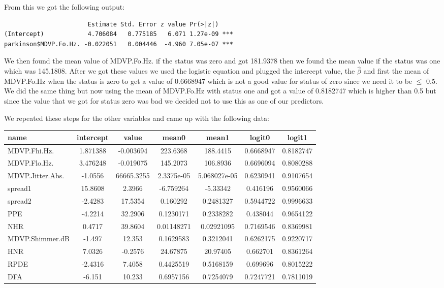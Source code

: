\documentclass{article}
\begin{document}
From this we got the following output:

\begin{verbatim}
                       Estimate Std. Error z value Pr(>|z|)    
(Intercept)            4.706084   0.775185   6.071 1.27e-09 ***
parkinson$MDVP.Fo.Hz. -0.022051   0.004446  -4.960 7.05e-07 ***
\end{verbatim}

We then found the mean value of MDVP.Fo.Hz. if the status was zero and got 181.9378 then we found the mean value if the status was one which was 145.1808. After we got these values we used the logistic equation and plugged the intercept value, the $\hat{\beta}$ and first the mean of MDVP.Fo.Hz when the status is zero to get a value of 0.6668947 which is not a good value for status of zero since we need it to be $\leq$ 0.5. We did the same thing but now using the mean of MDVP.Fo.Hz with status one and got a value of 0.8182747 which is higher than 0.5 but since the value that we got for status zero was bad we decided not to use this as one of our predictors.

We repeated these steps for the other variables and came up with the following data:

\begin{table}[h]
  \centering
\begin{tabular}{|l|c|c|c|c|c|c|}
\hline
name & intercept & value & mean0 & mean1 & logit0 & logit1 \\
\hline
MDVP.Fhi.Hz. & 1.871388 & -0.003694 & 223.6368 & 188.4415 & 0.6668947 & 0.8182747 \\
\hline
MDVP.Flo.Hz. & 3.476248 & -0.019075 & 145.2073 & 106.8936 & 0.6696094 & 0.8080288 \\
\hline
MDVP.Jitter.Abs. & -1.0556 & 66665.3255 & 2.3375e-05 & 5.068027e-05 & 0.6230941 & 0.9107654 \\
\hline
spread1 & 15.8608 & 2.3966 & -6.759264 & -5.33342 & 0.416196 & 0.9560066 \\
\hline
spread2 & -2.4283 & 17.5354 & 0.160292 & 0.2481327 & 0.5944722 & 0.9996633 \\
\hline
PPE & -4.2214 & 32.2906 & 0.1230171 & 0.2338282 & 0.438044 & 0.9654122 \\
\hline
NHR & 0.4717 & 39.8604 & 0.01148271 & 0.02921095 & 0.7169546 & 0.8369981 \\
\hline
MDVP.Shimmer.dB & -1.497 & 12.353 & 0.1629583 & 0.3212041 & 0.6262175 & 0.9220717 \\
\hline
HNR & 7.0326 & -0.2576 & 24.67875 & 20.97405 & 0.662701 & 0.8361264 \\
\hline
RPDE & -2.4316 & 7.4058 & 0.4425519 & 0.5168159 & 0.699696 & 0.8015222 \\
\hline
DFA & -6.151 & 10.233 & 0.6957156 & 0.7254079 & 0.7247721 & 0.7811019 \\
\hline
\end{tabular}
\end{table}
\end{document}
